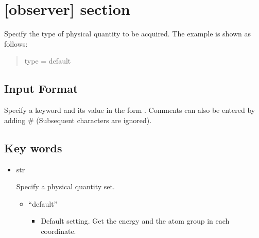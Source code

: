 \documentclass[letterpaper,10pt,english]{sphinxmanual}
\begin{document}
\section{{[}observer{]} section}
\label{\detokenize{file_specification/parameter_observer:observer-section}}\label{\detokenize{file_specification/parameter_observer::doc}}
Specify the type of physical quantity to be acquired.
The example is shown as follows:
\begin{quote}

\begin{sphinxVerbatim}[commandchars=\\\{\}]
[observer]
type = \PYGZsq{}default\PYGZsq{}
\end{sphinxVerbatim}
\end{quote}


\subsection{Input Format}
\label{\detokenize{file_specification/parameter_observer:input-format}}
Specify a keyword and its value in the form .
Comments can also be entered by adding \# (Subsequent characters are ignored).


\subsection{Key words}
\label{\detokenize{file_specification/parameter_observer:key-words}}\begin{itemize}
\item {} 

 str

Specify a physical quantity set.
\begin{itemize}
\item {} 
“default”
\begin{itemize}
\item {} 
Default setting. Get the energy and the atom group in each coordinate.

\end{itemize}

\end{itemize}

\end{itemize}
\end{document}
